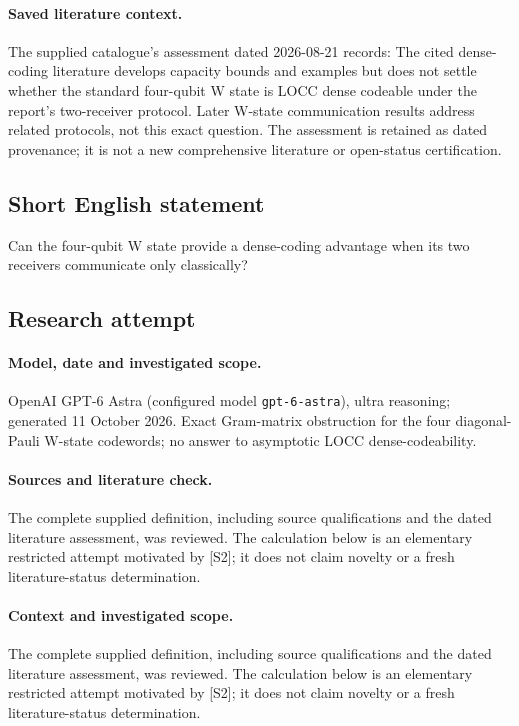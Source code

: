 \documentclass[11pt]{article}
\begin{document}
\paragraph{Saved literature context.} The supplied catalogue's assessment dated 2026-08-21 records: The cited dense-coding literature develops capacity bounds and examples but does not settle whether the standard four-qubit W state is LOCC dense codeable under the report's two-receiver protocol. Later W-state communication results address related protocols, not this exact question. The assessment is retained as dated provenance; it is not a new comprehensive literature or open-status certification.
\subsection{Short English statement}
Can the four-qubit W state provide a dense-coding advantage when its two receivers communicate only classically?
\subsection{Research attempt}
\paragraph{Model, date and investigated scope.}
OpenAI GPT-6 Astra (configured model \texttt{gpt-6-astra}), ultra reasoning; generated 11 October 2026. Exact Gram-matrix obstruction for the four diagonal-Pauli W-state codewords; no answer to asymptotic LOCC dense-codeability.

\paragraph{Sources and literature check.}
The complete supplied definition, including source qualifications and the dated literature assessment, was reviewed. The calculation below is an elementary restricted attempt motivated by [S2]; it does not claim novelty or a fresh literature-status determination.

\paragraph{Context and investigated scope.} The complete supplied definition, including source qualifications and the dated literature assessment, was reviewed. The calculation below is an elementary restricted attempt motivated by [S2]; it does not claim novelty or a fresh literature-status determination.
\end{document}
